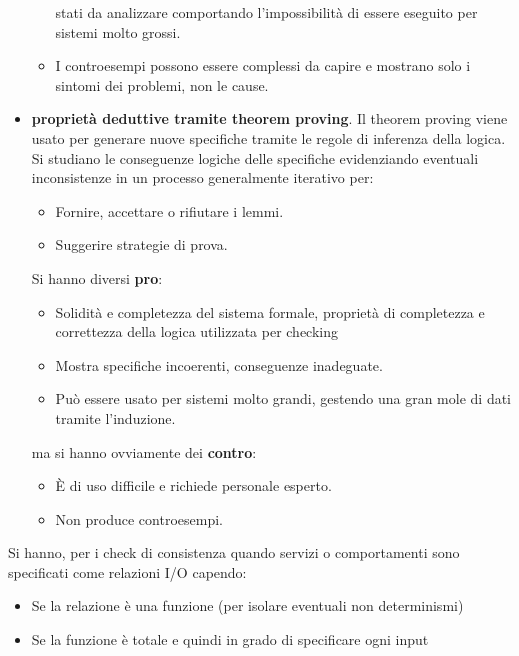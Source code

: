\begin{itemize}
\begin{itemize}
                        stati da analizzare comportando l'impossibilità di essere
                        eseguito per sistemi molto grossi.
                  \item I controesempi possono essere complessi da capire e
                        mostrano solo i sintomi dei problemi, non le cause.
            \end{itemize}
      \item \textbf{proprietà deduttive tramite theorem proving}. Il theorem proving viene
            usato per generare nuove specifiche tramite le regole di inferenza
            della logica. Si studiano le conseguenze logiche delle specifiche
            evidenziando eventuali inconsistenze in un processo generalmente
            iterativo per:
            \begin{itemize}
                  \item Fornire, accettare o rifiutare i lemmi.
                  \item Suggerire strategie di prova.
            \end{itemize}
            Si hanno diversi \textbf{pro}:
            \begin{itemize}
                  \item Solidità e completezza del sistema formale, proprietà di
                        completezza e correttezza della logica utilizzata per
                        checking
                  \item Mostra specifiche incoerenti, conseguenze inadeguate.
                  \item Può essere usato per sistemi molto grandi, gestendo una
                        gran mole di dati tramite l'induzione.
            \end{itemize}
            ma si hanno ovviamente dei \textbf{contro}:
            \begin{itemize}
                  \item È di uso difficile e richiede personale esperto.
                  \item Non produce controesempi.
            \end{itemize}
\end{itemize}
Si hanno, per i check di consistenza quando servizi o comportamenti sono
specificati come relazioni I/O capendo:
\begin{itemize}
      \item Se la relazione è una funzione (per isolare eventuali non determinismi)
      \item Se la funzione è totale e quindi in grado di specificare ogni input
\end{itemize}
